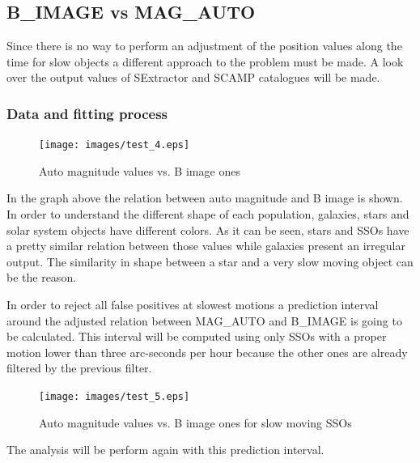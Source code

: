 \documentclass{article}
\begin{document}
\subsection{B\_IMAGE vs MAG\_AUTO}
Since there is no way to perform an adjustment of the position values along the time for slow objects a different approach to the problem must be made. A look over the output values of SExtractor and SCAMP catalogues will be made.

\subsubsection{Data and fitting process}

\begin{figure}[H]
\centering
\texttt{[image: images/test\_4.eps]}
\caption{Auto magnitude values vs. B image ones}
\end{figure}

\par In the graph above the relation between auto magnitude and B image is shown. In order to understand the different shape of each population, galaxies, stars and solar system objects have different colors. As it can be seen, stars and SSOs have a pretty similar relation between those values while galaxies present an irregular output. The similarity in shape between a star and a very slow moving object can be the reason.
\par In order to reject all false positives at slowest motions a prediction interval around the adjusted relation between MAG\_AUTO and B\_IMAGE is going to be calculated. This interval will be computed using only SSOs with a proper motion lower than three arc-seconds per hour because the other ones are already filtered by the previous filter.

\begin{figure}[H]
\centering
\texttt{[image: images/test\_5.eps]}
\caption{Auto magnitude values vs. B image ones for slow moving SSOs}
\end{figure}

The analysis will be perform again with this prediction interval.
\end{document}
